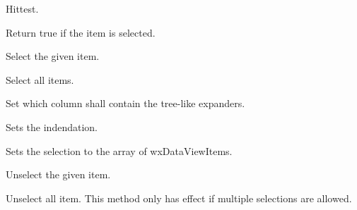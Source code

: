 
Hittest.

\label{wxdataviewctrlisselected}


Return true if the item is selected.

\label{wxdataviewctrlselect}


Select the given item.

\label{wxdataviewctrlselectall}


Select all items.

\label{wxdataviewctrlsetexpandercolumn}


Set which column shall contain the tree-like expanders.

\label{wxdataviewctrlsetindent}


Sets the indendation.

\label{wxdataviewctrlsetselections}


Sets the selection to the array of wxDataViewItems.

\label{wxdataviewctrlunselect}


Unselect the given item.

\label{wxdataviewctrlunselectall}


Unselect all item. This method only has effect if multiple
selections are allowed.

